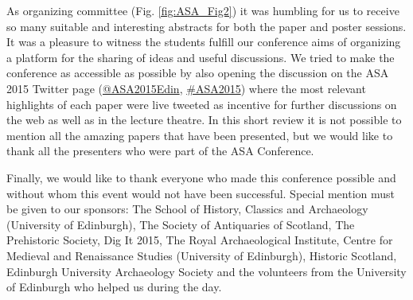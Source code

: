 As organizing committee (Fig. \ref{fig:ASA_Fig2}) it was humbling for us to receive so many suitable and interesting abstracts for both the paper and poster sessions. It was a pleasure to witness the students fulfill our conference aims of organizing a platform for the sharing of ideas and useful discussions. We tried to make the conference as accessible as possible by also opening the discussion on the ASA 2015 Twitter page (\href{https://twitter.com/asa2015edin}{@ASA2015Edin}, \href{https://twitter.com/search?q=\%23asa2015\&lang=en}{\#ASA2015}) where the most relevant highlights of each paper were live tweeted as incentive for further discussions on the web as well as in the lecture theatre. In this short review it is not possible to mention all the amazing papers that have been presented, but we would like to thank all the presenters who were part of the  ASA Conference.

	
Finally, we would like to thank everyone who made this conference possible and without whom this event would not have been successful. Special mention must be given to our sponsors: The School of History, Classics and Archaeology (University of Edinburgh), The Society of Antiquaries of Scotland, The Prehistoric Society, Dig It 2015, The Royal Archaeological Institute, Centre for Medieval and Renaissance Studies (University of Edinburgh), Historic Scotland, Edinburgh University Archaeology Society and the volunteers from the University of Edinburgh who helped us during the day.
\label{ASA:lastpage}
\closingarticle
\endinput
